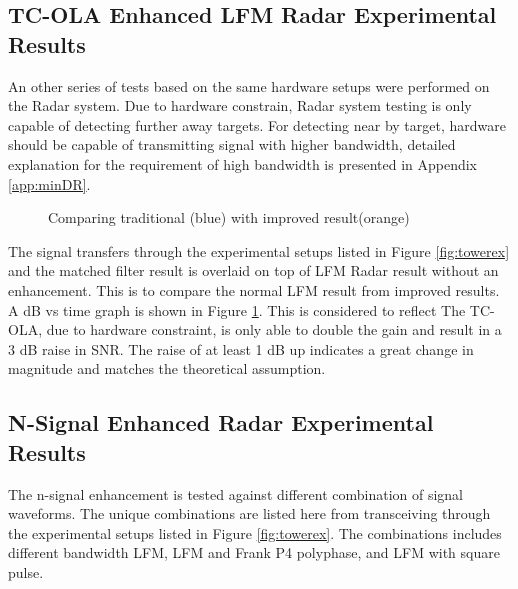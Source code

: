 \documentclass[letterpaper, 12 pt, conference]{report}
\numberwithin{figure}{section}
\begin{document}
\subsection{TC-OLA Enhanced LFM Radar Experimental Results}
An other series of tests based on the same hardware setups were performed on the Radar system. Due to hardware constrain, Radar system testing is only capable of detecting further away targets. For detecting near by target, hardware should be capable of transmitting signal with higher bandwidth, detailed explanation for the requirement of high bandwidth is presented in Appendix \ref{app:minDR}. \\
\begin{figure}[h]
\centering{}
\caption{Comparing traditional (blue) with improved result(orange)}
\label{fig:comp}
\end{figure}

The signal transfers through the experimental setups listed in Figure \ref{fig:towerex} and the matched filter result is overlaid on top of LFM Radar result without an enhancement. This is to compare the normal LFM result from improved results. A dB vs time graph is shown in Figure \ref{fig:comp}. This is considered to reflect  The TC-OLA, due to hardware constraint, is only able to double the gain and result in a 3 dB raise in SNR. The raise of at least 1 dB up indicates a great change in magnitude and matches the theoretical assumption.
\FloatBarrier
\subsection{N-Signal Enhanced Radar Experimental Results}
The n-signal enhancement is tested against different combination of signal waveforms. The unique combinations are listed here from transceiving through the experimental setups listed in Figure \ref{fig:towerex}. The combinations includes different bandwidth LFM, LFM and Frank P4 polyphase, and LFM with square pulse.\\
\end{document}
